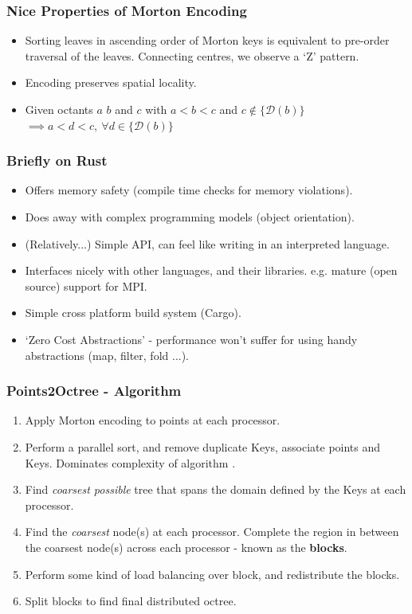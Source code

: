 \begin{frame}
    \frametitle{Nice Properties of Morton Encoding}
    \begin{itemize}
        \item Sorting leaves in ascending order of Morton keys is equivalent to pre-order traversal of the leaves. Connecting centres, we observe a `Z' pattern.
        \item Encoding preserves spatial locality.
        \item Given octants $a$ $b$ and $c$ with $a < b < c$ and $c \notin \{ \mathcal{D}(b) \}$ $\implies a < d < c, \> \forall d \in \{ \mathcal{D}(b) \} $
    \end{itemize}
\end{frame}

\begin{frame}
    \frametitle{Briefly on Rust}
    \begin{itemize}
        \item Offers memory safety (compile time checks for memory violations).
        \item Does away with complex programming models (object orientation).
        \item (Relatively...) Simple API, can feel like writing in an interpreted language.
        \item Interfaces nicely with other languages, and their libraries. e.g. mature (open source) support for MPI.
        \item Simple cross platform build system (Cargo).
        \item `Zero Cost Abstractions' - performance won't suffer for using handy abstractions (map, filter, fold ...).
    \end{itemize}
\end{frame}

\begin{frame}
    \frametitle{Points2Octree - Algorithm}
    \small
    \begin{enumerate}
        \item Apply Morton encoding to points at each processor.
        \item Perform a parallel sort, and remove duplicate Keys, associate points and Keys. Dominates complexity of algorithm \cite{Sundar2007}.
        \item Find \textit{coarsest possible} tree that spans the domain defined by the Keys at each processor.
        \item Find the \textit{coarsest} node(s) at each processor. Complete the region in between the coarsest node(s) across each processor - known as the \textbf{blocks}.
        \item Perform some kind of load balancing over block, and redistribute the blocks.
        \item Split blocks to find final distributed octree.
    \end{enumerate}
\end{frame}



